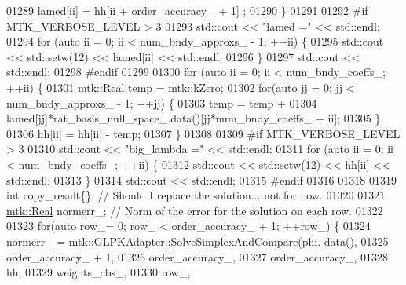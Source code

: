 \begin{DoxyCode}
{{01289       lamed[ii] = hh[ii + order\_accuracy\_ + 1] ;
01290     \}
01291 
01292 \textcolor{preprocessor}{    #if MTK\_VERBOSE\_LEVEL > 3}
01293     std::cout << \textcolor{stringliteral}{"lamed ="} << std::endl;
01294     \textcolor{keywordflow}{for} (\textcolor{keyword}{auto} ii = 0; ii < num\_bndy\_approxs\_ - 1; ++ii) \{
01295       std::cout << std::setw(12) << lamed[ii] << std::endl;
01296     \}
01297     std::cout << std::endl;
01298 \textcolor{preprocessor}{    #endif}
01299 
01300     \textcolor{keywordflow}{for} (\textcolor{keyword}{auto} ii = 0; ii < num\_bndy\_coeffs\_; ++ii) \{
01301       \hyperlink{group__c01-roots_gac080bbbf5cbb5502c9f00405f894857d}{mtk::Real} temp = \hyperlink{group__c01-roots_ga59a451a5fae30d59649bcda274fea271}{mtk::kZero};
01302       \textcolor{keywordflow}{for}(\textcolor{keyword}{auto} jj = 0; jj < num\_bndy\_approxs\_ - 1; ++jj) \{
01303         temp = temp +
01304           lamed[jj]*rat\_basis\_null\_space\_.data()[jj*num\_bndy\_coeffs\_ + ii];
01305       \}
01306       hh[ii] = hh[ii] - temp;
01307     \}
01308 
01309 \textcolor{preprocessor}{    #if MTK\_VERBOSE\_LEVEL > 3}
01310     std::cout << \textcolor{stringliteral}{"big\_lambda ="} << std::endl;
01311     \textcolor{keywordflow}{for} (\textcolor{keyword}{auto} ii = 0; ii < num\_bndy\_coeffs\_; ++ii) \{
01312       std::cout << std::setw(12) << hh[ii] << std::endl;
01313     \}
01314     std::cout << std::endl;
01315 \textcolor{preprocessor}{    #endif}
01316 
01318 
01319     \textcolor{keywordtype}{int} copy\_result\{\};  \textcolor{comment}{// Should I replace the solution... not for now.}
01320 
01321     \hyperlink{group__c01-roots_gac080bbbf5cbb5502c9f00405f894857d}{mtk::Real} normerr\_; \textcolor{comment}{// Norm of the error for the solution on each row.}
01322 
01323     \textcolor{keywordflow}{for}(\textcolor{keyword}{auto} row\_= 0; row\_ < order\_accuracy\_ + 1; ++row\_) \{
01324       normerr\_ = \hyperlink{classmtk_1_1GLPKAdapter_a834480aca83e3c0d09fdab7fdb7e8a3f}{mtk::GLPKAdapter::SolveSimplexAndCompare}(phi.
      \hyperlink{classmtk_1_1DenseMatrix_a0c33b8a9e01d157c61ddbdf807c25d84}{data}(),
01325                                                           order\_accuracy\_ + 1,
01326                                                           order\_accuracy\_,
01327                                                           order\_accuracy\_,
01328                                                           hh,
01329                                                           weights\_cbs\_,
01330                                                           row\_,
}}
\end{DoxyCode}
